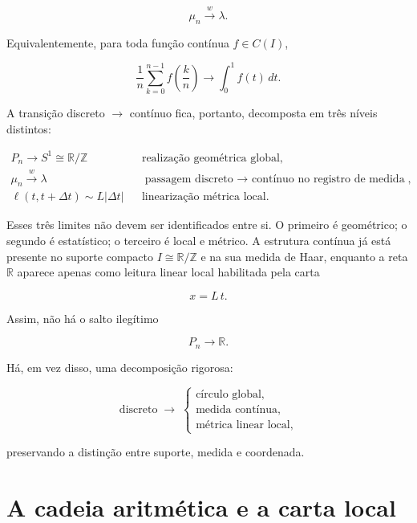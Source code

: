 \documentclass[11pt,a4paper]{article}
\begin{document}
$$
\boxed{
\mu_n\overset{w}{\longrightarrow}\lambda.
}
$$

Equivalentemente, para toda função contínua $f\in C(I)$,

$$
\boxed{
\frac1n
\sum_{k=0}^{n-1}
f\left(\frac{k}{n}\right)
\longrightarrow
\int_0^1f(t)\,dt.
}
$$

A transição discreto $\to$ contínuo fica, portanto, decomposta em três níveis distintos:

$$
\boxed{
\begin{array}{rll}
P_n\longrightarrow S^1\cong\mathbb R/\mathbb Z
&
&\text{realização geométrica global},
\\[4pt]
\mu_n\overset{w}{\longrightarrow}\lambda
&
&\text{passagem discreto $\to$ contínuo no registro de medida},
\\[4pt]
\ell(t,t+\Delta t)\sim L|\Delta t|
&
&\text{linearização métrica local}.
\end{array}
}
$$

Esses três limites não devem ser identificados entre si. O primeiro é geométrico; o segundo é estatístico; o terceiro é local e métrico. A estrutura contínua já está presente no suporte compacto $I\cong\mathbb R/\mathbb Z$ e na sua medida de Haar, enquanto a reta $\mathbb R$ aparece apenas como leitura linear local habilitada pela carta

$$
x=L\,t.
$$

Assim, não há o salto ilegítimo

$$
P_n\longrightarrow\mathbb R.
$$

Há, em vez disso, uma decomposição rigorosa:

$$
\boxed{
\text{discreto}
\;\longrightarrow\;
\begin{cases}
\text{círculo global},\\
\text{medida contínua},\\
\text{métrica linear local},
\end{cases}
}
$$

preservando a distinção entre suporte, medida e coordenada.

\section{A cadeia aritmética e a carta local}
\end{document}
